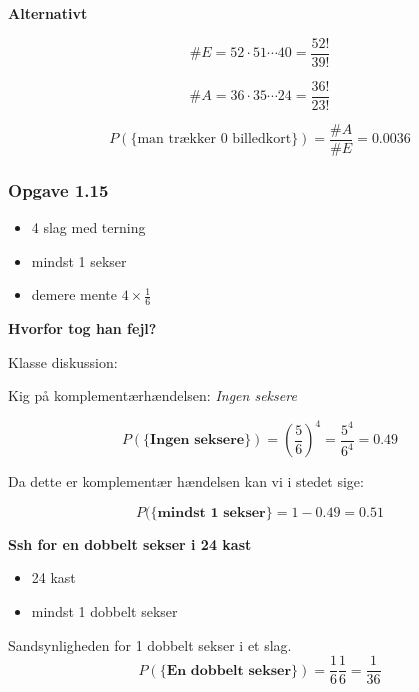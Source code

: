 \textbf{Alternativt}

\begin{equation}
    \# E = 52 \cdot 51 \cdots 40 = \frac{52!}{39!}
\end{equation}

\begin{equation}
    \# A = 36 \cdot 35 \cdots 24 = \frac{36!}{23!}
\end{equation}

\begin{equation}
    P(\{\text{man trækker 0 billedkort}\}) = \frac{\# A}{ \# E} = 0.0036
\end{equation}

\subsubsection{Opgave 1.15}


\begin{itemize}
    \item 4 slag med terning
    \item mindst 1 sekser
    \item demere mente $4\times \frac{1}{6}$
\end{itemize}

\textbf{Hvorfor tog han fejl?}

Klasse diskussion:

Kig på komplementærhændelsen: \textit{Ingen seksere}

\begin{equation}
    P(\{\textbf{Ingen seksere}\}) = (\frac{5}{6})^{4} = \frac{5^4}{6^4} = 0.49
\end{equation}

Da dette er komplementær hændelsen kan vi i stedet sige: 

\begin{equation}
    P(\{\textbf{mindst 1 sekser}\} = 1 - 0.49 = 0.51
\end{equation}

\textbf{Ssh for en dobbelt sekser i 24 kast}

\begin{itemize}
    \item 24 kast
    \item mindst 1 dobbelt sekser
\end{itemize}

Sandsynligheden for 1 dobbelt sekser i et slag.
\begin{equation}
    P(\{\textbf{En dobbelt sekser} \}) = \frac{1}{6}\frac{1}{6} = \frac{1}{36}
\end{equation}


